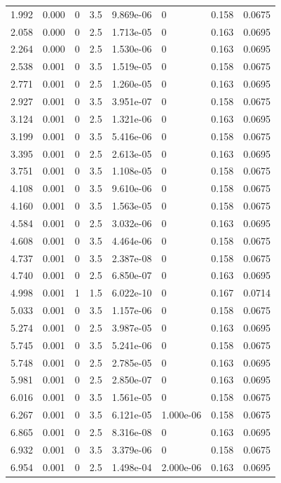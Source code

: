 \documentclass[preview]{standalone}
\begin{document}
{{\begin{tabular}{L{1.2cm}C{1.2cm} C{0.3cm}C{0.5cm} C{1.4cm}C{1.4cm} C{1.4cm}C{1.4cm}}
  1.992  &  0.000  & 0     & 3.5 &  9.869e-06  & 0  & 0.158 &  0.0675   \\ 
  2.058  &  0.000  & 0     & 2.5 &  1.713e-05  & 0  & 0.163 &  0.0695   \\ 
  2.264  &  0.000  & 0     & 2.5 &  1.530e-06  & 0  & 0.163 &  0.0695   \\ 
  2.538  &  0.001  & 0     & 3.5 &  1.519e-05  & 0  & 0.158 &  0.0675   \\ 
  2.771  &  0.001  & 0     & 2.5 &  1.260e-05  & 0  & 0.163 &  0.0695   \\ 
  2.927  &  0.001  & 0     & 3.5 &  3.951e-07  & 0  & 0.158 &  0.0675   \\ 
  3.124  &  0.001  & 0     & 2.5 &  1.321e-06  & 0  & 0.163 &  0.0695   \\ 
  3.199  &  0.001  & 0     & 3.5 &  5.416e-06  & 0  & 0.158 &  0.0675   \\ 
  3.395  &  0.001  & 0     & 2.5 &  2.613e-05  & 0  & 0.163 &  0.0695   \\ 
  3.751  &  0.001  & 0     & 3.5 &  1.108e-05  & 0  & 0.158 &  0.0675   \\ 
  4.108  &  0.001  & 0     & 3.5 &  9.610e-06  & 0  & 0.158 &  0.0675   \\ 
  4.160  &  0.001  & 0     & 3.5 &  1.563e-05  & 0  & 0.158 &  0.0675   \\ 
  4.584  &  0.001  & 0     & 2.5 &  3.032e-06  & 0  & 0.163 &  0.0695   \\ 
  4.608  &  0.001  & 0     & 3.5 &  4.464e-06  & 0  & 0.158 &  0.0675   \\ 
  4.737  &  0.001  & 0     & 3.5 &  2.387e-08  & 0  & 0.158 &  0.0675   \\ 
  4.740  &  0.001  & 0     & 2.5 &  6.850e-07  & 0  & 0.163 &  0.0695   \\ 
  4.998  &  0.001  & 1     & 1.5 &  6.022e-10  & 0  & 0.167 &  0.0714   \\ 
  5.033  &  0.001  & 0     & 3.5 &  1.157e-06  & 0  & 0.158 &  0.0675   \\ 
  5.274  &  0.001  & 0     & 2.5 &  3.987e-05  & 0  & 0.163 &  0.0695   \\ 
  5.745  &  0.001  & 0     & 3.5 &  5.241e-06  & 0  & 0.158 &  0.0675   \\ 
  5.748  &  0.001  & 0     & 2.5 &  2.785e-05  & 0  & 0.163 &  0.0695   \\ 
  5.981  &  0.001  & 0     & 2.5 &  2.850e-07  & 0  & 0.163 &  0.0695   \\ 
  6.016  &  0.001  & 0     & 3.5 &  1.561e-05  & 0  & 0.158 &  0.0675   \\ 
  6.267  &  0.001  & 0     & 3.5 &  6.121e-05  & 1.000e-06  & 0.158 &  0.0675   \\ 
  6.865  &  0.001  & 0     & 2.5 &  8.316e-08  & 0  & 0.163 &  0.0695   \\ 
  6.932  &  0.001  & 0     & 3.5 &  3.379e-06  & 0  & 0.158 &  0.0675   \\ 
  6.954  &  0.001  & 0     & 2.5 &  1.498e-04  & 2.000e-06  & 0.163 &  0.0695   \\ 
\hline 
\end{tabular} 

}}
\end{document}
